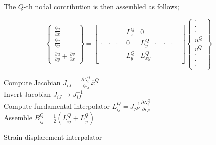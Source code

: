 The $Q$-th nodal contribution is then assembled as follows;


\begin{equation}
\left\{ {\begin{array}{*{20}{c}}
{\frac{{\partial u}}{{\partial x}}}\\
{\frac{{\partial v}}{{\partial y}}}\\
{\frac{{\partial u}}{{\partial y}} + \frac{{\partial v}}{{\partial x}}}
\end{array}} \right\} = \left[ {\begin{array}{*{20}{c}}
\cdot&\cdot&\cdot&{\begin{array}{*{20}{c}}
{L_x^Q}&0\\
0&{L_y^Q}\\
{L_y^Q}&{L_{xy}^Q}
\end{array}}\cdot&\cdot&\cdot&
\end{array}}\right]
\left\{ {\begin{array}{*{20}{c}}
\cdot\\
\cdot\\
\cdot\\
{{u^Q}}\\
{{v^Q}}\\
\cdot\\
\cdot\\
\cdot
\end{array}} \right\}
\label{eq:strain inter}
\end{equation}

\begin{algorithm}[H]
\SetAlgoLined
{}
Compute Jacobian ${J_{iJ}} = \frac{{\partial N_i^Q}}{{\partial {r_J}}}{{\hat x}^Q}$\\
Invert Jacobian  ${J_{iJ}} \to J_{iJ}^{ - 1}$\\
Compute fundamental interpolator $L_{ij}^Q = J_{jP}^{ - 1}\frac{{\partial N_i^Q}}{{\partial {r_P}}}$\\
Assemble $B_{ij}^Q = \frac{1}{2}\left( {L_{ij}^Q + L_{ji}^Q} \right)$ 
\caption{Strain-displacement interpolator}
\end{algorithm}



